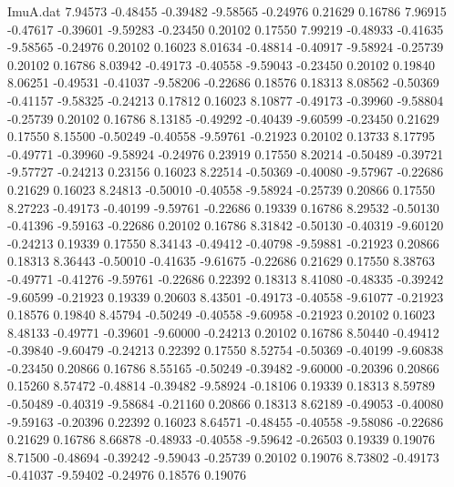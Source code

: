 \begin{filecontents}{ImuA.dat}
   7.94573   -0.48455   -0.39482   -9.58565   -0.24976    0.21629    0.16786
   7.96915   -0.47617   -0.39601   -9.59283   -0.23450    0.20102    0.17550
   7.99219   -0.48933   -0.41635   -9.58565   -0.24976    0.20102    0.16023
   8.01634   -0.48814   -0.40917   -9.58924   -0.25739    0.20102    0.16786
   8.03942   -0.49173   -0.40558   -9.59043   -0.23450    0.20102    0.19840
   8.06251   -0.49531   -0.41037   -9.58206   -0.22686    0.18576    0.18313
   8.08562   -0.50369   -0.41157   -9.58325   -0.24213    0.17812    0.16023
   8.10877   -0.49173   -0.39960   -9.58804   -0.25739    0.20102    0.16786
   8.13185   -0.49292   -0.40439   -9.60599   -0.23450    0.21629    0.17550
   8.15500   -0.50249   -0.40558   -9.59761   -0.21923    0.20102    0.13733
   8.17795   -0.49771   -0.39960   -9.58924   -0.24976    0.23919    0.17550
   8.20214   -0.50489   -0.39721   -9.57727   -0.24213    0.23156    0.16023
   8.22514   -0.50369   -0.40080   -9.57967   -0.22686    0.21629    0.16023
   8.24813   -0.50010   -0.40558   -9.58924   -0.25739    0.20866    0.17550
   8.27223   -0.49173   -0.40199   -9.59761   -0.22686    0.19339    0.16786
   8.29532   -0.50130   -0.41396   -9.59163   -0.22686    0.20102    0.16786
   8.31842   -0.50130   -0.40319   -9.60120   -0.24213    0.19339    0.17550
   8.34143   -0.49412   -0.40798   -9.59881   -0.21923    0.20866    0.18313
   8.36443   -0.50010   -0.41635   -9.61675   -0.22686    0.21629    0.17550
   8.38763   -0.49771   -0.41276   -9.59761   -0.22686    0.22392    0.18313
   8.41080   -0.48335   -0.39242   -9.60599   -0.21923    0.19339    0.20603
   8.43501   -0.49173   -0.40558   -9.61077   -0.21923    0.18576    0.19840
   8.45794   -0.50249   -0.40558   -9.60958   -0.21923    0.20102    0.16023
   8.48133   -0.49771   -0.39601   -9.60000   -0.24213    0.20102    0.16786
   8.50440   -0.49412   -0.39840   -9.60479   -0.24213    0.22392    0.17550
   8.52754   -0.50369   -0.40199   -9.60838   -0.23450    0.20866    0.16786
   8.55165   -0.50249   -0.39482   -9.60000   -0.20396    0.20866    0.15260
   8.57472   -0.48814   -0.39482   -9.58924   -0.18106    0.19339    0.18313
   8.59789   -0.50489   -0.40319   -9.58684   -0.21160    0.20866    0.18313
   8.62189   -0.49053   -0.40080   -9.59163   -0.20396    0.22392    0.16023
   8.64571   -0.48455   -0.40558   -9.58086   -0.22686    0.21629    0.16786
   8.66878   -0.48933   -0.40558   -9.59642   -0.26503    0.19339    0.19076
   8.71500   -0.48694   -0.39242   -9.59043   -0.25739    0.20102    0.19076
   8.73802   -0.49173   -0.41037   -9.59402   -0.24976    0.18576    0.19076

\end{filecontents}
